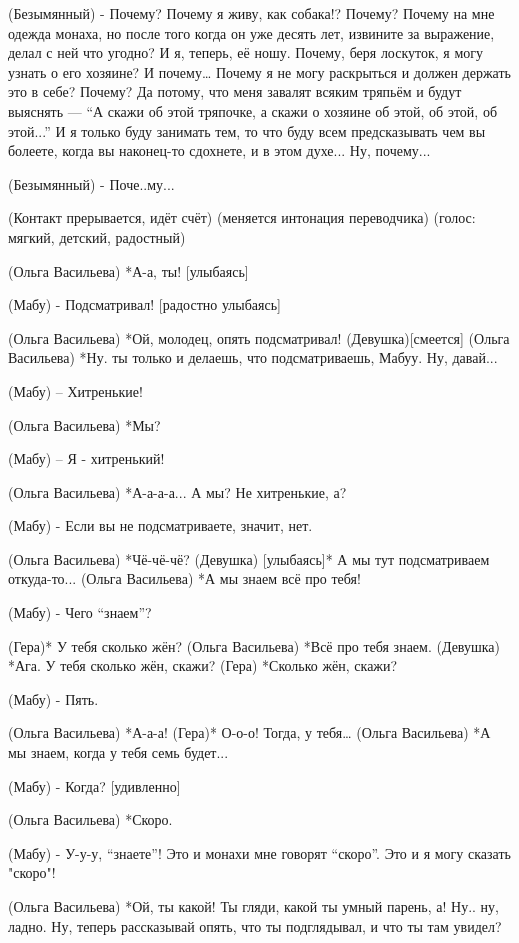 (Безымянный) - Почему? Почему я живу, как собака!? Почему? Почему на мне одежда монаха, но после того когда он уже десять лет, извините за выражение,  делал с ней что угодно? И я, теперь, её ношу. Почему, беря лоскуток, я могу узнать о его хозяине? И почему… Почему я не могу раскрыться и должен держать это в себе? Почему? Да потому, что меня завалят всяким тряпьём и будут выяснять — “А скажи об этой тряпочке, а скажи о хозяине об этой, об этой, об этой...” И я только буду занимать тем, то что буду всем предсказывать чем вы болеете, когда вы наконец-то сдохнете, и в этом духе... Ну, почему...

(Безымянный) - Поче..му...

(Контакт прерывается, идёт счёт)
(меняется интонация переводчика)
(голос: мягкий, детский, радостный)


(Ольга Васильева) *А-а, ты! [улыбаясь]

(Мабу) - Подсматривал! [радостно улыбаясь]

(Ольга Васильева) *Ой, молодец, опять подсматривал!
(Девушка)[смеется]
(Ольга Васильева) *Ну. ты только и делаешь, что подсматриваешь, Мабуу. Ну, давай...

(Мабу) – Хитренькие!

(Ольга Васильева) *Мы?

(Мабу) – Я - хитренький!

(Ольга Васильева) *А-а-а-а... А мы? Не хитренькие, а?

(Мабу) - Если вы не подсматриваете, значит, нет.

(Ольга Васильева) *Чё-чё-чё?
(Девушка) [улыбаясь]* А мы тут подсматриваем откуда-то...
(Ольга Васильева) *А мы знаем всё про тебя!

(Мабу) - Чего “знаем”?

(Гера)* У тебя сколько жён?
(Ольга Васильева) *Всё про тебя знаем.
(Девушка) *Ага. У тебя сколько жён, скажи?
(Гера) *Сколько жён, скажи?

(Мабу) - Пять.

(Ольга Васильева)  *А-а-а!
(Гера)* О-о-о! Тогда, у тебя…
(Ольга Васильева)  *А мы знаем, когда у тебя семь будет...

(Мабу) - Когда? [удивленно]

(Ольга Васильева) *Скоро.

(Мабу) - У-у-у, “знаете”! Это и монахи мне говорят “скоро”. Это и я могу сказать "скоро"!

(Ольга Васильева) *Ой, ты какой! Ты гляди, какой ты умный парень, а! Ну.. ну, ладно. Ну, теперь рассказывай опять, что ты подглядывал, и что ты там увидел?

